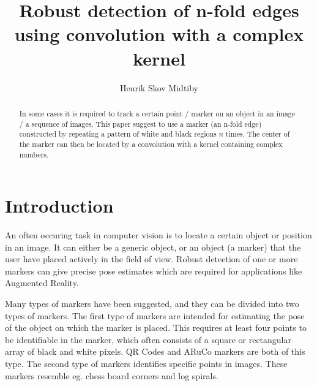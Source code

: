 \documentclass{article}
\title{Robust detection of n-fold edges using convolution with a complex kernel}
\author{Henrik Skov Midtiby}
\begin{document}
\doublespacing
\maketitle
\begin{abstract}
In some cases it is required to track a certain point / marker on an object in an image / a sequence of images.
This paper suggest to use a marker (an n-fold edge) constructed by repeating a
pattern of white and black regions $n$ times.
The center of the marker can then be located by a convolution with a kernel containing complex numbers.
\end{abstract}
\section{Introduction}
An often occuring task in computer vision is to locate a certain object or position in an image.
It can either be a generic object, or an object (a marker) that the user have placed actively in the field of view.
Robust detection of one or more markers can give precise pose estimates which are required for applications like Augmented Reality.

Many types of markers have been suggested, and they can be divided into two types of markers.
The first type of markers are intended for estimating the pose of the object on which the marker is placed.
This requires at least four points to be identifiable in the marker, which often consists of a square or rectangular
array of black and white pixels.
QR Codes and ARuCo markers are both of this type.
The second type of markers identifies specific points in images.
These markers resemble eg. chess board corners and log spirals.
\end{document}
